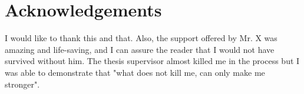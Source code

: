 \chapter*{Acknowledgements}
\pagestyle{empty}
\markboth{}{}

I would like to thank this and that. Also, the support offered by Mr. X was amazing and life-saving, and I can assure the reader that I would not have survived without him. The thesis supervisor almost killed me in the process but I was able to demonstrate that "what does not kill me, can only make me stronger".

